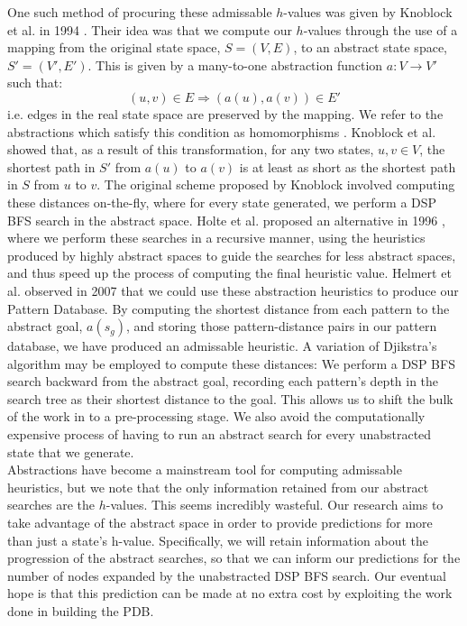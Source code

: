 \documentclass{article}
\begin{document}
One such method of procuring these admissable \(h\)-values was
given by Knoblock et al. in 1994  \cite{knoblock1994automatically}.
Their idea was that we compute our \(h\)-values through the use of a mapping from the original state space, \(S = (V, E)\),
to an abstract state space, \(S' = (V', E')\). This is given by a many-to-one abstraction function  \(a : V \rightarrow V'\) such that:
\[(u, v) \in E \Rightarrow (a(u), a(v)) \in E'\]
i.e. edges
in the real state space are preserved by the mapping.
We refer to the abstractions which satisfy this condition as homomorphisms \cite{holte1996hierarchical, helmert2007flexible}.
Knoblock et al. showed that, as a result of this transformation, for any two states, \(u,v \in V\),
the shortest path in \(S'\) from \(a(u)\) to \(a(v)\) is
at least as short as the shortest path in \(S\) from \(u\) to \(v\).
The original scheme proposed by Knoblock involved computing these distances
on-the-fly, where for every state generated, we perform a DSP BFS search in the abstract space.
Holte et al. proposed an alternative in 1996  \cite{holte1996hierarchical},
where we perform these searches in a recursive manner,
using the heuristics produced by highly abstract spaces to guide the searches for less abstract spaces,
and thus speed up the process of computing the final heuristic value.
Helmert et al. observed in 2007 \cite{helmert2007flexible} that we could use these abstraction 
heuristics to produce our Pattern Database.
By computing the shortest distance from each pattern to the abstract goal,
\(a(s_g)\), and storing those pattern-distance pairs in our pattern database,
we have produced an admissable heuristic.
A variation of Djikstra's algorithm may be employed to compute these distances:
We perform a DSP BFS search backward from the abstract goal,
recording each pattern's depth in the search tree as their shortest distance to the goal.
This allows us to shift the bulk of the work in to a pre-processing stage.
We also avoid the computationally expensive process of having to run an abstract search
for every unabstracted state that we generate. \\

Abstractions have become a mainstream tool for computing admissable heuristics,
but we note that the only information retained from our abstract searches are the \(h\)-values.
This seems incredibly wasteful.
Our research aims to take advantage of the abstract space
in order to provide predictions for more than just a state's h-value.
Specifically, we will retain information about the progression
of the abstract searches, so that we can inform our predictions
for the number of nodes expanded by the unabstracted DSP BFS search.
Our eventual hope is that this prediction can be made at no extra cost by exploiting
the work done in building the PDB.
\end{document}
